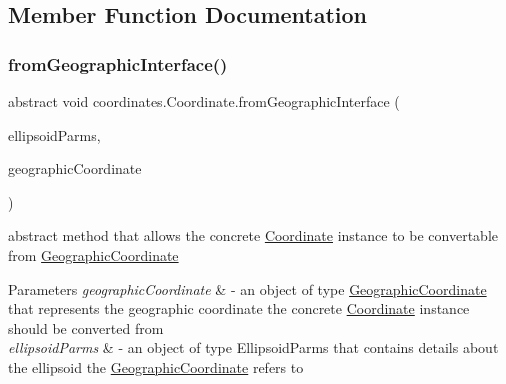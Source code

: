 \subsection{Member Function Documentation}
\mbox{\label{classcoordinates_1_1_coordinate_a7307326f53867082a66d1f96cfb1d7d0}} 
\subsubsection{\texorpdfstring{from\+Geographic\+Interface()}{fromGeographicInterface()}}
{\footnotesize\ttfamily abstract void coordinates.\+Coordinate.\+from\+Geographic\+Interface (\begin{DoxyParamCaption}\item[{\hyperlink{classparams_1_1_ellipsoid_parms}{Ellipsoid\+Parms}}]{ellipsoid\+Parms,  }\item[{\hyperlink{classcoordinates_1_1_geographic_coordinate_interface}{Geographic\+Coordinate\+Interface}}]{geographic\+Coordinate }\end{DoxyParamCaption})\hspace{0.3cm}{\ttfamily [abstract]}}



abstract method that allows the concrete \hyperlink{classcoordinates_1_1_coordinate}{Coordinate} instance to be convertable from \hyperlink{classcoordinates_1_1_geographic_coordinate}{Geographic\+Coordinate} 


\begin{DoxyParams}{Parameters}
{\em geographic\+Coordinate} & -\/ an object of type \hyperlink{classcoordinates_1_1_geographic_coordinate}{Geographic\+Coordinate} that represents the geographic coordinate the concrete \hyperlink{classcoordinates_1_1_coordinate}{Coordinate} instance should be converted from \\
\hline
{\em ellipsoid\+Parms} & -\/ an object of type Ellipsoid\+Parms that contains details about the ellipsoid the \hyperlink{classcoordinates_1_1_geographic_coordinate}{Geographic\+Coordinate} refers to \\
\hline
\end{DoxyParams}
\mbox{\label{classcoordinates_1_1_coordinate_a97342479914743d999cef4b38f9124ed}} 
